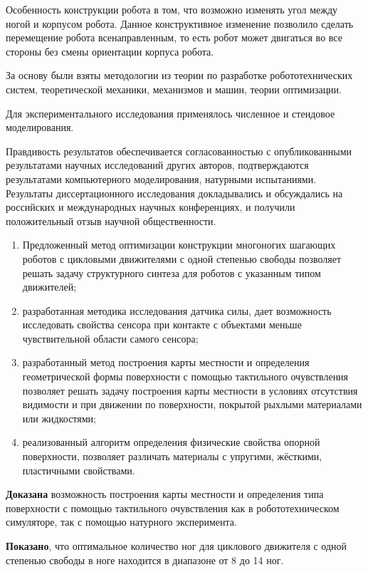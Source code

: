 Особенность конструкции робота в том, что возможно изменять угол между ногой и корпусом робота. Данное конструктивное изменение позволило сделать перемещение робота всенаправленным, то есть робот может двигаться во все стороны без смены ориентации корпуса робота.


{\methods} За основу были взяты методологии из теории по разработке робототехнических систем, теоретической механики, механизмов и машин, теории оптимизации.

Для экспериментального исследования применялось численное и стендовое моделирования.

{\reliability} Правдивость результатов обеспечивается согласованностью с опубликованными результатами научных исследований других авторов, подтверждаются результатами компьютерного моделирования, натурными испытаниями. Результаты диссертационного исследования докладывались и обсуждались на российских и международных научных конференциях, и получили положительный отзыв научной общественности.


{\novelty} 
\begin{enumerate}
    \item Предложенный метод оптимизации конструкции многоногих шагающих роботов с цикловыми движителями с одной степенью свободы позволяет решать задачу структурного синтеза для роботов с указанным типом движителей;
    \item разработанная методика исследования датчика силы, дает возможность исследовать свойства сенсора при контакте с объектами меньше чувствительной области самого сенсора;
    \item разработанный метод построения карты местности и определения геометрической формы поверхности с помощью тактильного очувствления позволяет решать задачу построения карты местности в условиях отсутствия видимости и при движении по поверхности, покрытой рыхлыми материалами или жидкостями;
    \item реализованный алгоритм определения физические свойства опорной поверхности, позволяет различать материалы с упругими, жёсткими, пластичными свойствами.
\end{enumerate}


\textbf{Доказана} возможность построения карты местности и определения типа поверхности с помощью тактильного очувствления как в робототехническом симуляторе, так с помощью натурного эксперимента.

\textbf{Показано}, что оптимальное количество ног для циклового движителя с одной степенью свободы в ноге находится в диапазоне от 8 до 14 ног. 

